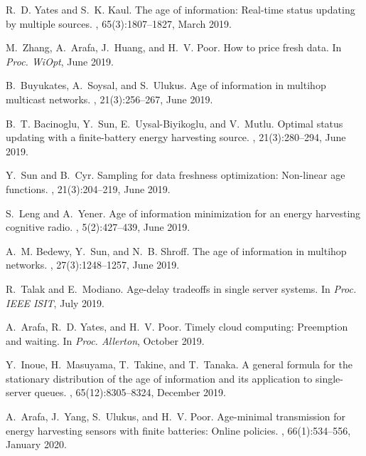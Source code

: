 \documentclass[12pt,journal,onecolumn]{IEEEtran}
\begin{document}
\begin{thebibliography}{10}
R.~D. Yates and S.~K. Kaul.
\newblock The age of information: Real-time status updating by multiple
  sources.
, 65(3):1807--1827, March 2019.

M.~Zhang, A.~Arafa, J.~Huang, and H.~V. Poor.
\newblock How to price fresh data.
\newblock In {\em Proc. WiOpt}, June 2019.

B.~Buyukates, A.~Soysal, and S.~Ulukus.
\newblock Age of information in multihop multicast networks.
, 21(3):256--267, June 2019.

B.~T. Bacinoglu, Y.~Sun, E.~Uysal-Biyikoglu, and V.~Mutlu.
\newblock Optimal status updating with a finite-battery energy harvesting
  source.
, 21(3):280--294, June 2019.

Y.~Sun and B.~Cyr.
\newblock Sampling for data freshness optimization: Non-linear age functions.
, 21(3):204--219, June 2019.

S.~Leng and A.~Yener.
\newblock Age of information minimization for an energy harvesting cognitive
  radio.
, 5(2):427--439, June 2019.

A.~M. Bedewy, Y.~Sun, and N.~B. Shroff.
\newblock The age of information in multihop networks.
, 27(3):1248--1257, June 2019.

R.~Talak and E.~Modiano.
\newblock Age-delay tradeoffs in single server systems.
\newblock In {\em Proc. IEEE ISIT}, July 2019.

A.~Arafa, R.~D. Yates, and H.~V. Poor.
\newblock Timely cloud computing: Preemption and waiting.
\newblock In {\em Proc. Allerton}, October 2019.

Y.~Inoue, H.~Masuyama, T.~Takine, and T.~Tanaka.
\newblock A general formula for the stationary distribution of the age of
  information and its application to single-server queues.
, 65(12):8305--8324, December 2019.

A.~Arafa, J.~Yang, S.~Ulukus, and H.~V. Poor.
\newblock Age-minimal transmission for energy harvesting sensors with finite
  batteries: Online policies.
, 66(1):534--556, January 2020.


\end{thebibliography}
\end{document}
